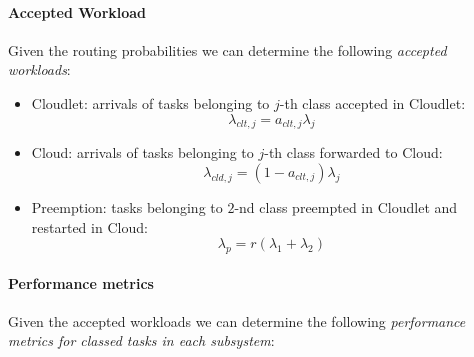 \paragraph{Accepted Workload}
Given the routing probabilities we can determine the following \textit{accepted workloads}:

\begin{itemize}
	\item Cloudlet: arrivals of tasks belonging to $j$-th class accepted in Cloudlet:
	\begin{equation}
	\lambda_{clt,j} = a_{clt,j}\lambda_{j}
	\end{equation}
	
	\item Cloud: arrivals of tasks belonging to $j$-th class forwarded to Cloud:
	\begin{equation}
	\lambda_{cld,j} = (1-a_{clt,j})\lambda_{j}
	\end{equation}
	
	\item Preemption: tasks belonging to $2$-nd class preempted in Cloudlet and restarted in Cloud:
	\begin{equation}
	\lambda_{p} = r(\lambda_{1}+\lambda_{2})
	\end{equation}
\end{itemize}

\paragraph{Performance metrics}
Given the accepted workloads we can determine the following \textit{performance metrics for classed tasks in each subsystem}:

